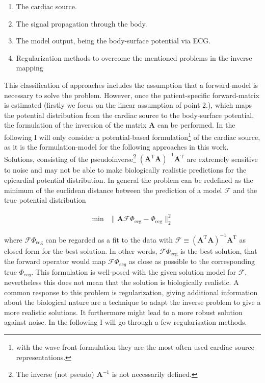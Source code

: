 \begin{enumerate}
    \item The cardiac source.
    \item The signal propagation through the body.
    \item The model output, being the body-surface potential via ECG.
    \item Regularization methods to overcome the mentioned problems in the inverse mapping
\end{enumerate}
This classification of approaches includes the assumption that a forward-model is necessary to solve the problem.
However, once the patient-specific forward-matrix is estimated (firstly we focus on the linear assumption of point 2.), which maps the potential distribution from the cardiac source to the body-surface potential, the formulation of the inversion of the matrix $\textbf{A}$ can be performed. In the following I will only consider a potential-based formulation\footnote{with the wave-front-formulation they are the most often used cardiac source representations\cite{cluitmans_noninvasive_2015}.} of the cardiac source, as it is the formulation-model for the following approaches in this work. Solutions, consisting of the pseudoinverse\footnote{The inverse (not pseudo) $\textbf{A}^{-1}$ is not necessarily defined.}
$(\textbf{A}^{\text{T}}\textbf{A})^{-1}\textbf{A}^{\text{T}}$ are extremely sensitive to noise and may not be able to make biologically realistic predictions for the epicardial potential distribution. In general the problem can be redefined as the minimum of the euclidean distance between the prediction of a model $\mathcal{F}$ and the true potential distribution 

\begin{align}
    \label{eq:linear_regression}
    \min&\parallel\textbf{A}\mathcal{F}\varPhi_{\text{ecg}}-\varPhi_{\text{ecg}}\parallel_2^2
\end{align}

where $\mathcal{F}\varPhi_{\text{ecg}}$ can be regarded as a fit to the data with $\mathcal{F}\equiv(\textbf{A}^{\text{T}}\textbf{A})^{-1}\textbf{A}^{\text{T}}$ as closed form for the best solution. In other words, $\mathcal{F}\varPhi_{\text{ecg}}$ is the best solution, that the forward operator would map $\mathcal{F}\varPhi_{ecg}$ as close as possible to the corresponding true $\varPhi_{ecg}$. This formulation is well-posed with the given solution model for $\mathcal{F}$, nevertheless this does not mean that the solution is biologically realistic.
A common response to this problem is regularization, giving additional information about the biological nature are a technique to adapt the inverse problem to give a more realistic solutions. It furthermore might lead to a more robust solution against noise. 
In the following I will go through a few regularisation methods.

